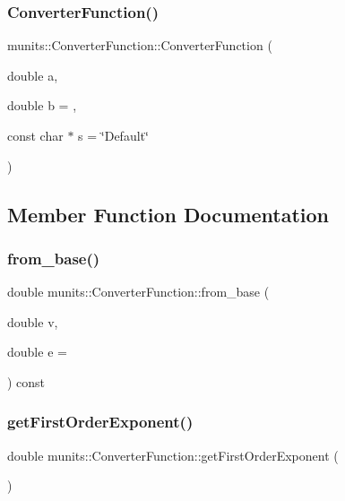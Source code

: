 \subsubsection{\texorpdfstring{Converter\+Function()}{ConverterFunction()}}
{\footnotesize\ttfamily munits\+::\+Converter\+Function\+::\+Converter\+Function (\begin{DoxyParamCaption}\item[{double}]{a,  }\item[{double}]{b = {},  }\item[{const char $\ast$}]{s = {\ttfamily \char`\"{}Default\char`\"{}} }\end{DoxyParamCaption})\hspace{0.3cm}{\ttfamily [explicit]}}



\subsection{Member Function Documentation}
\mbox{\label{classmunits_1_1_converter_function_a06dfbd71248463c6d3d4b0cdda251612}} 
\subsubsection{\texorpdfstring{from\+\_\+base()}{from\_base()}}
{\footnotesize\ttfamily double munits\+::\+Converter\+Function\+::from\+\_\+base (\begin{DoxyParamCaption}\item[{double}]{v,  }\item[{double}]{e = {} }\end{DoxyParamCaption}) const}

\mbox{\label{classmunits_1_1_converter_function_a1b3777fbb09c52bc9456fbae09295cfc}} 
\subsubsection{\texorpdfstring{get\+First\+Order\+Exponent()}{getFirstOrderExponent()}}
{\footnotesize\ttfamily double munits\+::\+Converter\+Function\+::get\+First\+Order\+Exponent (\begin{DoxyParamCaption}{ }\end{DoxyParamCaption})\hspace{0.3cm}{\ttfamily [inline]}}

